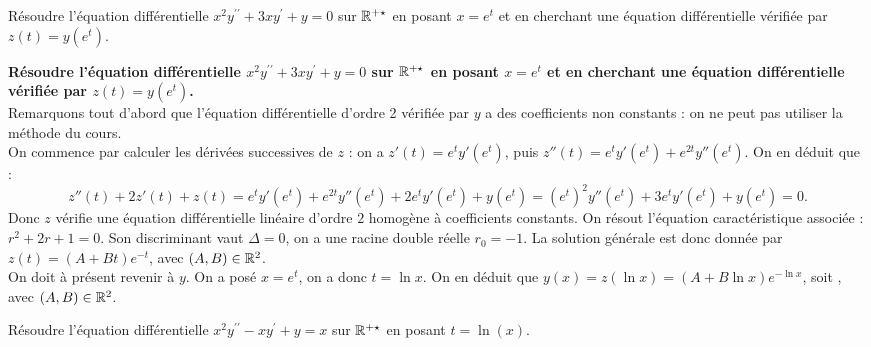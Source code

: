 \documentclass[a4paper, 11pt,reqno]{article}
\begin{document}
\begin{exercice}  \;
R\'esoudre l'\'equation diff\'erentielle $x^2y^{\prime\prime}+3xy^{\prime}+y=0$ sur $\mathbb{R}^{+\star}$ en posant $x=e^t$ et en cherchant une \'equation diff\'erentielle v\'erifi\'ee par $z(t)=y(e^t)$.
\end{exercice}
\begin{correction}  \;
\textbf{R\'esoudre l'\'equation diff\'erentielle $x^2y^{\prime\prime}+3xy^{\prime}+y=0$ sur $\mathbb{R}^{+\star}$ en posant $x=e^t$ et en cherchant une \'equation diff\'erentielle v\'erifi\'ee par $z(t)=y(e^t)$.}\\
Remarquons tout d'abord que l'\'equation diff\'erentielle d'ordre 2 v\'erifi\'ee par $y$ a des coefficients non constants : on ne peut pas utiliser la m\'ethode du cours.\\
On commence par calculer les d\'eriv\'ees successives de $z$ : on a $z'(t) = e^t y'(e^t)$, puis $z''(t) = e^t y'(e^t) + e^{2t} y''(e^t)$. On en d\'eduit que :
$$z''(t) + 2z'(t) + z(t) = e^t y'(e^t) + e^{2t} y''(e^t) + 2 e^t y'(e^t) + y(e^t) = (e^t)^2 y''(e^t) + 3 e^t y'(e^t) + y(e^t) = 0.$$
Donc $z$ v\'erifie une \'equation diff\'erentielle lin\'eaire d'ordre $2$ homog\`ene \`a coefficients constants. On r\'esout l'\'equation caract\'eristique associ\'ee : $r^2+2r+1=0$. Son discriminant vaut $\Delta = 0$, on a une racine double r\'eelle $r_0=-1$. La solution g\'en\'erale est donc donn\'ee par $z(t) = (A+Bt) e^{-t}$, avec $(A,B) \in \mathbb{R}^2$.\\ 
On doit \`a pr\'esent revenir \`a $y$. On a pos\'e $x=e^t$, on a donc $t = \ln x$. On en d\'eduit que $y(x) = z(\ln x) = (A+B\ln x) e^{-\ln x}$, soit , avec  $(A,B) \in \mathbb{R}^2$.
\end{correction}
\begin{exercice}  \;
R\'esoudre l'\'equation diff\'erentielle $x^2y^{\prime\prime}-xy^{\prime}+y=x$ sur $\mathbb{R}^{+\star}$ en posant $t=\ln{(x)}$.
\end{exercice}
\end{document}
